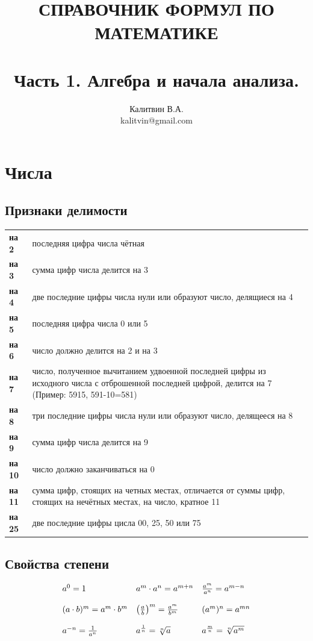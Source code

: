 \documentclass[a4paper, 14pt]{extarticle}
\begin{document}
\author{Калитвин В.А.\\
kalitvin@gmail.com}
{\large
\title{\bf СПРАВОЧНИК ФОРМУЛ ПО МАТЕМАТИКЕ\\
\ 
\\ 
Часть 1. Алгебра и начала анализа.}
\maketitle
\thispagestyle{empty}
\newpage

\section{Числа}

\subsection{Признаки делимости}

\begin{tabular}{lp{}}
\textbf{на 2} & последняя цифра числа чётная\\ 
\textbf{на 3} & сумма цифр числа делится на 3\\ 
\textbf{на 4} & две последние цифры числа нули или образуют число, делящиеся на 4\\
\textbf{на 5} & последняя цифра числа 0 или 5\\
\textbf{на 6} & число должно делится на 2 и на 3\\
\textbf{на 7} & число, полученное вычитанием удвоенной последней цифры из исходного числа с отброшенной последней цифрой, делится на 7 
\break (Пример: 5915, 591-10=581)\\
\textbf{на 8} & три последние цифры числа нули или образуют число, делящееся на 8\\
\textbf{на 9} & сумма цифр числа делится на 9\\
\textbf{на 10} & число должно заканчиваться на 0\\
\textbf{на 11} & сумма цифр, стоящих на четных местах, отличается от суммы цифр, стоящих на нечётных местах, на число, кратное 11\\
\textbf{на 25} & две последние цифры цисла 00, 25, 50 или 75\\
\end{tabular} 

\subsection{Свойства степени}
$$
\begin{array}{lll}
a^0=1 
& 
a^m\cdot a^n=a^{m+n}
&
\frac{a^m}{a^n}=a^{m-n}
\\
\
\\
(a\cdot b)^m=a^m\cdot b^m 
& 
\left(\frac{a}{b}\right)^m =\frac{a^m}{b^m}
&
(a^m)^n=a^{mn}\\
\ 
\\
a^{-n}=\frac{1}{a^n} 
&
a^{\frac{1}{n}}=\root{n}\of{a}
&
a^{\frac{m}{n}}=\root{n}\of{a^m}\\
\end{array}
$$

}
\end{document}
